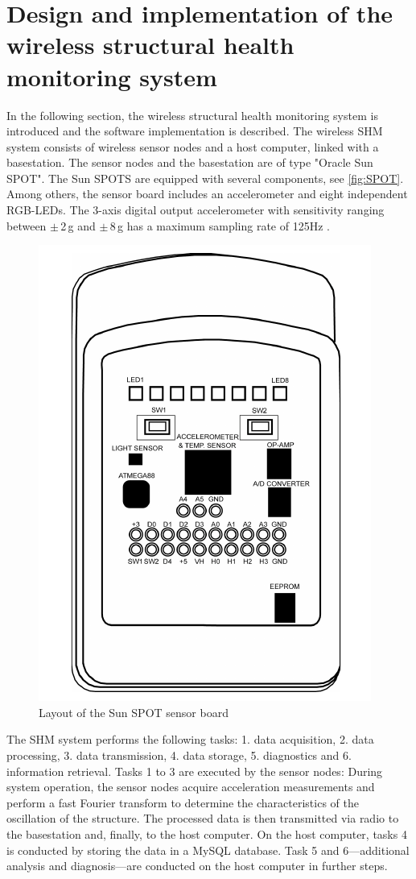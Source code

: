\documentclass[12pt,a4paper]{scrartcl}
\begin{document}
\section*{Design and implementation of the wireless structural health monitoring system}
In the following section, the wireless structural health monitoring system is introduced and the software implementation is described.
The wireless SHM system consists of wireless sensor nodes and a host computer, linked with a basestation.
The sensor nodes and the basestation are of type "Oracle Sun SPOT". 
The Sun SPOTS are equipped with several components, see \autoref{fig:SPOT}.
Among others, the sensor board includes an accelerometer and eight independent RGB-LEDs.
The 3-axis digital output accelerometer with sensitivity ranging between $\pm$\,2\,g and $\pm$\,8\,g has a maximum sampling rate of 125Hz \citep{eDemo2010}.

\begin{figure}[ht]
    \centering
    \includegraphics[scale=0.5]{figures/eDemoboard.png}
    \caption{Layout of the Sun SPOT sensor board \cite{spotToO}}
    \label{fig:SPOT}
\end{figure}

The SHM system performs the following tasks:
1. data acquisition,
2. data processing,
3. data transmission, 
4. data storage,
5. diagnostics and 
6. information retrieval.
Tasks 1 to 3 are executed by the sensor nodes: During system operation, the sensor nodes acquire acceleration measurements and perform a fast Fourier transform to determine the characteristics of the oscillation of the structure. 
The processed data is then transmitted via radio to the basestation and, finally, to the host computer.
On the host computer, tasks 4 is conducted by storing the data in a MySQL database.
Task 5 and 6---additional analysis and diagnosis---are conducted on the host computer in further steps.
\end{document}
